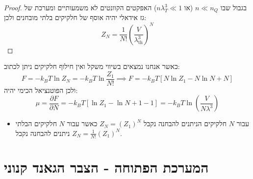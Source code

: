 \documentclass{tstextbook}
\begin{document}
\begin{proof}
בגבול שבו \(n\ll n_{Q}\) (או \(n\lambda_{T}^{3}\ll 1\)) האפקטים הקוונטים לא משמעותיים ומערכת של גז אידאלי יהיה אוסף של חלקיקים בלתי מובחנים ולכן:
$$Z_{N}=\frac{1}{N!}\left(\frac{V}{\lambda_{\mathrm{th}}^{3}}\right)^{N}$$

\end{proof}
\begin{example}
כאשר אנחנו נמצאים בשיווי משקל ואין חילוף חלקיקים ניתן לכתוב:
$$F=-k_{B}T\ln Z_{N}=-k_{B}T\ln \frac{Z_{1}}{N!}\implies F=-k_{B}T\left[ N\ln Z_{1}-N\ln N+N \right]$$
ולכן הפוטנציאל הכימי יהיה:
$$\mu=\frac{\partial F}{\partial N} =-k_{B}T\left[ \ln Z_{1}-\ln N+1 -1 \right]=-k_{B}T\ln \left( \frac{V}{N\lambda^{3}} \right)$$

\end{example}
\begin{summary}
  \begin{itemize}
    \item עבור \(N\) חלקיקים הניתנים להבחנה נקבל \(Z_{N}=(Z_{1})^{N}\) כאשר עבור \(N\) חלקיקים הבלתי ניתנים להבחנה נקבל \(Z_{N}=\frac{1}{N!}(Z_{1})^{N}\).
  \end{itemize}
\end{summary}
\section{המערכת הפתוחה - הצבר הגאנד קנוני}
\end{document}
